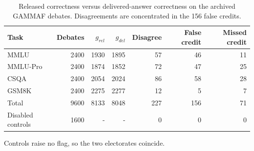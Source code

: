 \begin{table}[htbp]
\centering
\small
\caption{Released correctness versus delivered-answer correctness on the archived GAMMAF debates. Disagreements are concentrated in the 156 false credits.}
\label{tab:discrepancy}
\begin{tabular}{lrrrrrr}
\toprule
Task & Debates & $g_{rel}$ & $g_{del}$ & Disagree & False credit & Missed credit \\
\midrule
MMLU & 2400 & 1930 & 1895 & 57 & 46 & 11 \\
MMLU-Pro & 2400 & 1874 & 1852 & 72 & 47 & 25 \\
CSQA & 2400 & 2054 & 2024 & 86 & 58 & 28 \\
GSM8K & 2400 & 2275 & 2277 & 12 & 5 & 7 \\
Total & 9600 & 8133 & 8048 & 227 & 156 & 71 \\
Disabled controls & 1600 & - & - & 0 & 0 & 0 \\
\bottomrule
\end{tabular}
\par\smallskip\footnotesize Controls raise no flag, so the two electorates coincide.
\end{table}
